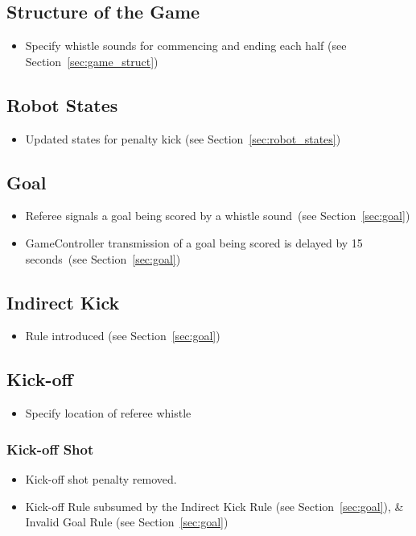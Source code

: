 \documentclass[12pt]{article}
\newcommand{\cf}{see\xspace}
\newcommand{\GoalScoredDelay}{15 seconds\xspace}
\begin{document}
\subsection*{Structure of the Game}
\begin{itemize}
  \item Specify whistle sounds for commencing and ending each half (\cf Section~\ref{sec:game_struct})
\end{itemize}

\subsection*{Robot States}
\begin{itemize}
  \item Updated states for penalty kick (\cf Section~\ref{sec:robot_states})
\end{itemize}

\subsection*{Goal}
\begin{itemize}
  \item Referee signals a goal being scored by a whistle sound~(\cf Section~\ref{sec:goal})
  \item GameController transmission of a goal being scored is delayed by \GoalScoredDelay~(\cf Section~\ref{sec:goal})
\end{itemize}

\subsection*{Indirect Kick}
\begin{itemize}
  \item Rule introduced (\cf Section~\ref{sec:goal})
\end{itemize}

\subsection*{Kick-off}
\begin{itemize}
  \item Specify location of referee whistle
\end{itemize}

\subsubsection*{Kick-off Shot}
\begin{itemize}
  \item Kick-off shot penalty removed.
  \item Kick-off Rule subsumed by the Indirect Kick Rule (\cf Section~\ref{sec:goal}), \& Invalid Goal Rule (\cf Section~\ref{sec:goal})
\end{itemize}
\end{document}
